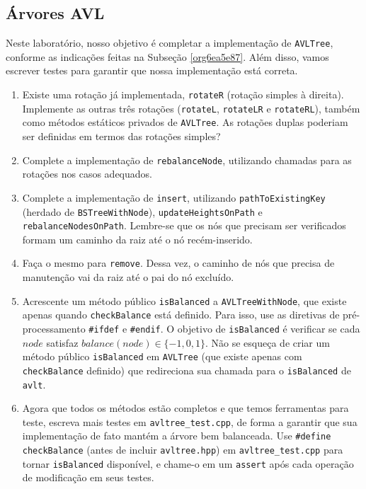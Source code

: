 \documentclass[11pt]{article}
\begin{document}
\subsection{Árvores AVL}
\label{sec:org75cd03a}

Neste laboratório, nosso objetivo é completar a implementação de
\texttt{AVLTree}, conforme as indicações feitas na Subseção \ref{org6ea5e87}.  Além
disso, vamos escrever testes para garantir que nossa implementação
está correta.

\begin{enumerate}
\item Existe uma rotação já implementada, \texttt{rotateR} (rotação simples à
direita).  Implemente as outras três rotações (\texttt{rotateL},
\texttt{rotateLR} e \texttt{rotateRL}), também como métodos estáticos privados
de \texttt{AVLTree}.  As rotações duplas poderiam ser definidas em
termos das rotações simples?
\item Complete a implementação de \texttt{rebalanceNode}, utilizando chamadas
para as rotações nos casos adequados.
\item Complete a implementação de \texttt{insert}, utilizando
\texttt{pathToExistingKey} (herdado de \texttt{BSTreeWithNode}),
\texttt{updateHeightsOnPath} e \texttt{rebalanceNodesOnPath}.  Lembre-se que
os nós que precisam ser verificados formam um caminho da raiz
até o nó recém-inserido.
\item Faça o mesmo para \texttt{remove}.  Dessa vez, o caminho de nós que
precisa de manutenção vai da raiz até o pai do nó excluído.
\item Acrescente um método público \texttt{isBalanced} a \texttt{AVLTreeWithNode},
que existe apenas quando \texttt{checkBalance} está definido.  Para
isso, use as diretivas de pré-processamento \texttt{\#ifdef} e \texttt{\#endif}.
O objetivo de \texttt{isBalanced} é verificar se cada \(node\) satisfaz
\(balance(node) \in \{-1, 0, 1\}\).  Não se esqueça de criar um
método público \texttt{isBalanced} em \texttt{AVLTree} (que existe apenas com
\texttt{checkBalance} definido) que redireciona sua chamada para o
\texttt{isBalanced} de \texttt{avlt}.
\item Agora que todos os métodos estão completos e que temos
ferramentas para teste, escreva mais testes em
\texttt{avltree\_test.cpp}, de forma a garantir que sua implementação de
fato mantém a árvore bem balanceada.  Use \texttt{\#define checkBalance}
(antes de incluir \texttt{avltree.hpp}) em \texttt{avltree\_test.cpp} para
tornar \texttt{isBalanced} disponível, e chame-o em um \texttt{assert} após
cada operação de modificação em seus testes.
\end{enumerate}
\end{document}
